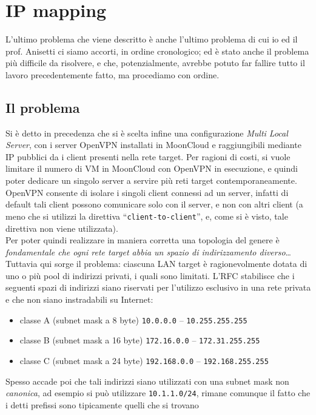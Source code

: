 \section{IP mapping}
L'ultimo problema che viene descritto è anche l'ultimo problema di cui io ed il
prof. Anisetti ci siamo accorti, in ordine cronologico; ed è stato anche il problema
più difficile da risolvere, e che, potenzialmente, avrebbe potuto far fallire
tutto il lavoro precedentemente fatto, ma procediamo con ordine.

\subsection{Il problema}
Si è detto in precedenza che si è scelta infine una configurazione \textit{Multi Local
Server}, con i server OpenVPN installati in MoonCloud e raggiungibili mediante IP
pubblici da i client presenti nella rete target. Per ragioni di costi, si vuole
limitare il numero di VM in MoonCloud con OpenVPN in esecuzione, e quindi poter
dedicare un singolo server a servire più reti target contemporaneamente. OpenVPN
consente di isolare i singoli client connessi ad un server, infatti di default
tali client possono comunicare solo con il server, e non con altri client (a meno
che si utilizzi la direttiva ``\texttt{client-to-client}'', e, come si è visto,
tale direttiva non viene utilizzata).\\
Per poter quindi realizzare in maniera corretta una topologia del genere è
\textit{fondamentale che ogni rete target abbia un spazio di indirizzamento diverso}\ldots
Tuttavia qui sorge il problema: ciascuna LAN target è ragionevolmente dotata
di uno o più pool di indirizzi privati, i quali sono limitati. L'RFC \cite{rfc-private-addr}
stabilisce che i seguenti spazi di indirizzi siano riservati per l'utilizzo esclusivo
in una rete privata e che non siano instradabili su Internet:
\begin{itemize}
  \item classe A (subnet mask a 8 byte) \texttt{10.0.0.0} -- \texttt{10.255.255.255}
  \item classe B (subnet mask a 16 byte) \texttt{172.16.0.0} -- \texttt{172.31.255.255}
  \item classe C (subnet mask a 24 byte) \texttt{192.168.0.0} -- \texttt{192.168.255.255}
\end{itemize}
Spesso accade poi che tali indirizzi siano utilizzati con una subnet mask non
\textit{canonica}, ad esempio si può utilizzare \texttt{10.1.1.0/24}, rimane
comunque il fatto che i detti prefissi sono tipicamente quelli che si trovano
